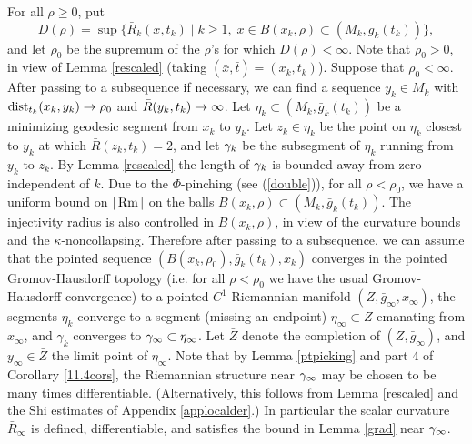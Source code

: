 For all $\rho\geq 0$, put
\begin{equation}
D(\rho) = \sup\{\bar R_k(x,t_k)\mid k\geq 1,\;x\in B(x_k,\rho)\subset
(M_k,\bar g_k(t_k))\},
\end{equation}
and let $\rho_0$ be the supremum of the $\rho$'s for which
$D(\rho)<\infty$.  Note that $\rho_0>0$, in view of Lemma \ref{rescaled}
(taking $(\bar x,\bar t)=(x_k,t_k)$).
Suppose that $\rho_0<\infty$.
After passing to a subsequence if necessary, we can find
a sequence $y_k\in M_k$ with $\operatorname{dist}_{t_k}(x_k,y_k) \rightarrow \rho_0$
and $\bar R(y_k,t_k)\rightarrow\infty$.    Let $\eta_k\subset (M_k,\bar g_k(t_k))$
be a minimizing geodesic segment from $x_k$ to $y_k$.
Let $z_k\in \eta_k$ be the point on $\eta_k$ closest to $y_k$
at which $\bar R(z_k,t_k)=2$, and let $\gamma_k$
be the subsegment of $\eta_k$ running from $y_k$ to $z_k$.  By
Lemma \ref{rescaled} the length of $\gamma_k$ is bounded away from zero
independent of $k$.  Due to the $\Phi$-pinching
(see (\ref{double})),
for all $\rho<\rho_0$, we have a uniform bound on $|\operatorname{Rm}|$
on the balls $B(x_k,\rho)\subset (M_k,\bar g_k(t_k))$.  The
injectivity radius is also controlled in $B(x_k,\rho)$,
in view of the curvature bounds and the $\kappa$-noncollapsing.
Therefore after passing
to a subsequence, we can assume that the pointed sequence
$(B(x_k,\rho_0),\bar g_k(t_k),x_k)$ converges in the pointed
Gromov-Hausdorff topology (i.e. for all $\rho<\rho_0$ we have the
usual Gromov-Hausdorff convergence) to a pointed $C^1$-Riemannian manifold
$(Z,\bar g_\infty,x_\infty)$,  the segments $\eta_k$ converge to a  segment (missing
an endpoint)
$\eta_\infty\subset Z$ emanating from $x_\infty$, and $\gamma_k$
converges to  $\gamma_\infty\subset\eta_\infty$.  Let $\bar Z$
denote the completion of $(Z,\bar g_\infty)$, and $y_\infty\in \bar Z$
the limit point of $\eta_\infty$.    Note that by
Lemma \ref{ptpicking} and
part 4 of Corollary \ref{11.4cors}, the Riemannian structure near
$\gamma_\infty$ may be chosen to be many times differentiable.
(Alternatively, this follows from Lemma \ref{rescaled} and the Shi
estimates of Appendix \ref{applocalder}.)
In particular
the scalar curvature $\bar R_\infty$ is defined, differentiable,
and satisfies the bound in Lemma \ref{grad} near $\gamma_\infty$.


